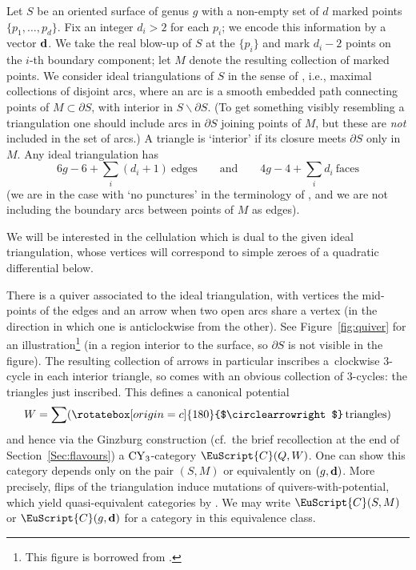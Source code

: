 \documentclass[10pt,a4paper]{amsart}
\newcommand{\scrC}{\EuScript{C}}
\def\Circlearrowright{\ensuremath{%
 \rotatebox[origin=c]{180}{$\circlearrowright$}}}
\theoremstyle{definition}
\numberwithin{equation}{section}
\begin{document}
Let $S$ be an oriented surface of genus $g$ with a non-empty set of $d$ marked points $\{p_1,\dots,p_d\}$. Fix an integer $d_i > 2$ for each $p_i$; we encode this information by a vector $\bf{d}$. We take the real blow-up of $S$ at the $\{p_i\}$ and mark $d_i-2$ points on the $i$-th boundary component; let $M$ denote the resulting collection of marked points. We consider ideal triangulations of $S$ in the sense of \cite{FST}, i.e., maximal collections of disjoint arcs, where an arc is a smooth embedded path connecting points of $M \subset \partial S$, with interior in $S \backslash \partial S$. (To get something visibly resembling a triangulation one should include arcs in $\partial S$ joining points of $M$, but these are \emph{not} included in the set of arcs.) A triangle is `interior' if its closure meets $\partial S$ only in $M$. Any ideal triangulation has
\begin{equation} \label{eqn:edges and faces}
6g-6+ \sum_i (d_i+1) \ \mathrm{edges} \qquad \mathrm{and} \qquad 4g-4+\sum_i d_i \ \mathrm{faces}
\end{equation}
(we are in the case with `no punctures' in the terminology of \cite{BS}, and we are not including the boundary arcs between points of $M$ as edges).

We will be interested in the cellulation which is dual to the given ideal triangulation, whose vertices will correspond to simple zeroes of a quadratic differential below.

There is a quiver associated to the ideal triangulation, with vertices the mid-points of the edges and an arrow when two open arcs share a vertex (in the direction in which one is anticlockwise from the other). See Figure~\ref{fig:quiver} for an illustration\footnote{This figure is borrowed from \cite{BS}.} (in a region interior to the surface, so $\partial S$ is not visible in the figure).
The resulting collection of arrows in particular inscribes a~clockwise 3-cycle in each interior triangle, so comes with an obvious collection of $3$-cycles: the triangles just inscribed. This defines a canonical potential
\[
W =\sum (\Circlearrowright \, \mathrm{triangles})
\]
and hence via the Ginzburg construction (cf.~the brief recollection at the end of Section~\ref{Sec:flavours}) a ${\rm CY}_3$-category $\scrC(Q,W) $. One can show this category depends only on the pair $(S,M)$ or equivalently on $(g,\bf{d})$. More precisely, flips of the triangulation induce mutations of quivers-with-potential, which yield quasi-equivalent categories by \cite{Keller-Yang}. We may write $\scrC(S,M)$ or $\scrC(g,\mathbf{d})$ for a category in this equivalence class.
\end{document}
